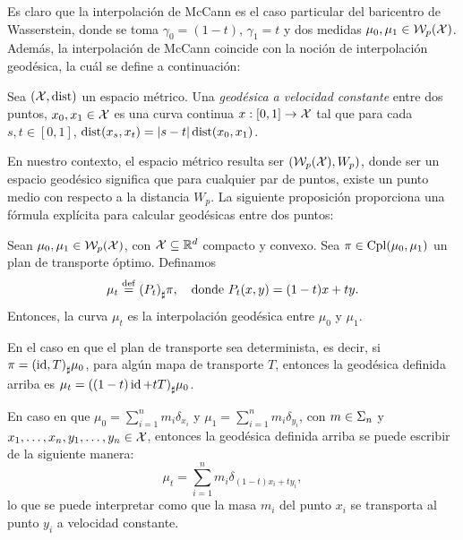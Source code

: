 {{{			Es claro que la interpolación de McCann es el caso particular del baricentro de Wasserstein, donde se toma $\gamma_0 = (1-t)$, $\gamma_1 = t$ y dos medidas $\mu_0, \mu_1 \in \WassersteinSpace[p]{\cX} $. Además, la interpolación de McCann coincide con la noción de interpolación geodésica, la cuál se define a continuación:

			\begin{definition}
				Sea $(\cX, \dist)$ un espacio métrico. Una \emph{geodésica a velocidad constante}  entre dos puntos, $x_0, x_1 \in \cX$ es una curva continua $x : [0, 1] \to \cX$  tal que para cada $s, t \in [0, 1]$, $\dist(x_s,x_t) = |s - t| \dist(x_0,x_1) $.
			\end{definition}

			En nuestro contexto, el espacio métrico resulta ser $(\WassersteinSpace[p]{\cX} , W_p)$, donde ser un espacio geodésico significa que para cualquier par de puntos, existe un punto medio con respecto a la distancia $W_p$. La siguiente proposición proporciona una fórmula explícita para calcular geodésicas entre dos puntos:

			\begin{proposition}
				Sean $\mu_0, \mu_1 \in \WassersteinSpace[p]{\cX} $, con $\cX \subseteq \R^d$  compacto y convexo. Sea $\pi \in \Cpl(\mu_0, \mu_1)$  un plan de transporte óptimo. Definamos
				\begin{equation}
					\mu_t \eqdef \pf{(P_t)} \pi, \quad \text{donde } P_t(x, y) = (1-t)x + ty.
				\end{equation}
				Entonces, la curva $\mu_t$ es la interpolación geodésica entre $\mu_0$ y $\mu_1$.

			\end{proposition}

			\begin{example}
				En el caso en que el plan de transporte sea determinista, es decir, si $\pi = \pf{(\id, T)} \mu_0$, para algún mapa de transporte $T$, entonces la geodésica definida arriba es $\mu_t = \pf{((1-t)\id + tT)} \mu_0$.
			\end{example}

			\begin{remark}
				En caso en que $\mu_0 = \sum_{i=1}^{n} m_i \delta_{x_i}$ y $\mu_1 = \sum_{i=1}^{n} m_i \delta_{y_i}$, con $m\in\Simplex[n]$ y $x_1,\ldots, x_n, y_1,\ldots, y_n \in \cX$, entonces la geodésica definida arriba se puede escribir de la siguiente manera:
				\begin{equation}
					\mu_t = \sum_{i=1}^{n} m_i \delta_{(1-t)x_i + ty_i},
				\end{equation}
				lo que se puede interpretar como que la masa $m_i$ del punto $x_i$ se transporta al punto $y_i$ a velocidad constante.
			\end{remark}




}}}
